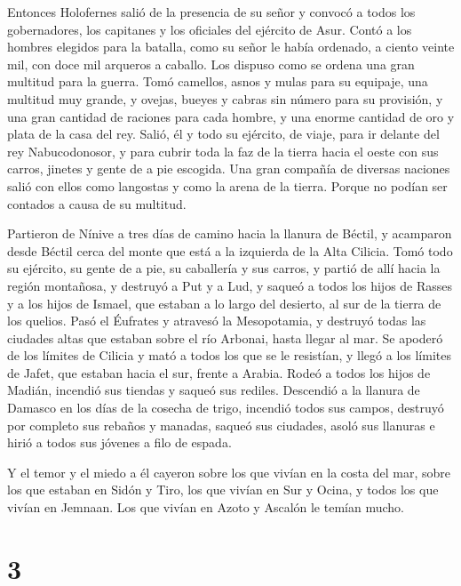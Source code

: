  Entonces Holofernes salió de la presencia de su señor y
convocó a todos los gobernadores, los capitanes y los oficiales del
ejército de Asur.  Contó a los hombres elegidos para la
batalla, como su señor le había ordenado, a ciento veinte mil, con doce
mil arqueros a caballo.  Los dispuso como se ordena una
gran multitud para la guerra.  Tomó camellos, asnos y
mulas para su equipaje, una multitud muy grande, y ovejas, bueyes y
cabras sin número para su provisión,  y una gran cantidad
de raciones para cada hombre, y una enorme cantidad de oro y plata de la
casa del rey.  Salió, él y todo su ejército, de viaje,
para ir delante del rey Nabucodonosor, y para cubrir toda la faz de la
tierra hacia el oeste con sus carros, jinetes y gente de a pie escogida.
 Una gran compañía de diversas naciones salió con ellos
como langostas y como la arena de la tierra. Porque no podían ser
contados a causa de su multitud.

 Partieron de Nínive a tres días de camino hacia la
llanura de Béctil, y acamparon desde Béctil cerca del monte que está a
la izquierda de la Alta Cilicia.  Tomó todo su ejército,
su gente de a pie, su caballería y sus carros, y partió de allí hacia la
región montañosa,  y destruyó a Put y a Lud, y saqueó a
todos los hijos de Rasses y a los hijos de Ismael, que estaban a lo
largo del desierto, al sur de la tierra de los quelios. 
Pasó el Éufrates y atravesó la Mesopotamia, y destruyó todas las
ciudades altas que estaban sobre el río Arbonai, hasta llegar al mar.
 Se apoderó de los límites de Cilicia y mató a todos los
que se le resistían, y llegó a los límites de Jafet, que estaban hacia
el sur, frente a Arabia.  Rodeó a todos los hijos de
Madián, incendió sus tiendas y saqueó sus rediles. 
Descendió a la llanura de Damasco en los días de la cosecha de trigo,
incendió todos sus campos, destruyó por completo sus rebaños y manadas,
saqueó sus ciudades, asoló sus llanuras e hirió a todos sus jóvenes a
filo de espada.

 Y el temor y el miedo a él cayeron sobre los que vivían
en la costa del mar, sobre los que estaban en Sidón y Tiro, los que
vivían en Sur y Ocina, y todos los que vivían en Jemnaan. Los que vivían
en Azoto y Ascalón le temían mucho.

\hypertarget{section-2}{%
\section{3}\label{section-2}}


